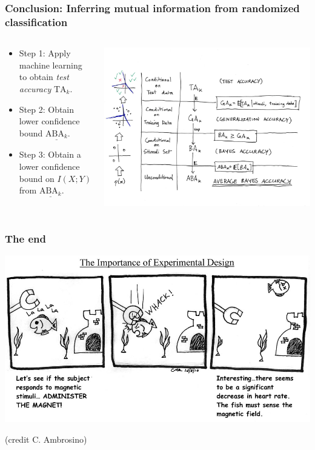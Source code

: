 \documentclass{beamer}
\begin{document}
\begin{frame}
\frametitle{Conclusion: Inferring mutual information from randomized classification}
\begin{columns}
\begin{column}{0.5\textwidth}
\begin{itemize}
\item Step 1: Apply machine learning to obtain \emph{test accuracy} $\text{TA}_k$.
\item Step 2: Obtain lower confidence bound $\underline{\text{ABA}_k}$.
\item Step 3: Obtain a lower confidence bound on $I(X; Y)$ from $\underline{\text{ABA}_k}$.
\end{itemize}
\end{column}
\begin{column}{0.5\textwidth}
\begin{center}
\includegraphics[scale = 0.3, clip = true, trim = 0in 1in 5.5in 1in]{ta_to_aba.png}
\end{center}   
\end{column}
\end{columns}
\end{frame}

\begin{frame}
\frametitle{The end}
\begin{center}
\includegraphics[scale = 1]{c_ambrosino.jpg}


{\tiny(credit C. Ambrosino)}
\end{center}
\end{frame}
\end{document}

